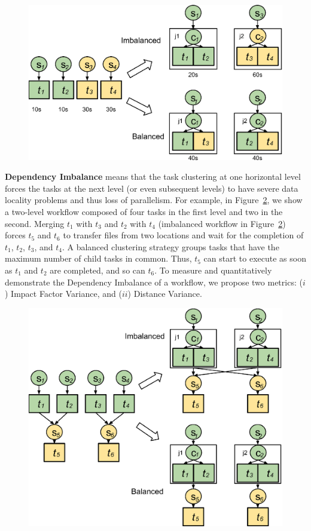 \documentclass[final,5p,times,twocolumn]{elsarticle}
\begin{document}
\begin{figure}[htb]
	\centering
	\includegraphics[width=0.95\linewidth]{figure5.eps}
	\label{fig:imbalance_rv}
\end{figure}


\textbf{Dependency Imbalance} means that the task clustering at one horizontal level forces the tasks at the next level (or even subsequent levels) to have severe data locality problems and thus loss of parallelism. For example, in Figure~\ref{fig:imbalance_dv}, we show a two-level workflow composed of four tasks in the first level and two in the second. Merging $t_1$ with $t_3$ and $t_2$ with $t_4$ (imbalanced workflow in Figure~\ref{fig:imbalance_dv}) forces $t_5$ and $t_6$ to transfer files from two locations and wait for the completion of $t_1$, $t_2$, $t_3$, and $t_4$.  A balanced clustering strategy groups tasks that have the maximum number of child tasks in common. Thus, $t_5$ can start to execute as soon as $t_1$ and $t_2$ are completed, and so can $t_6$. To measure and quantitatively demonstrate the Dependency Imbalance of a workflow, we propose two  metrics: ($i$) Impact Factor Variance, and ($ii$) Distance Variance. 

\begin{figure}[htb]
	\centering
	\includegraphics[width=0.95\linewidth]{figure6.eps}
	\label{fig:imbalance_dv}
\end{figure}
\end{document}
